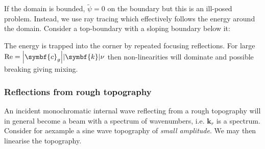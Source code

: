 \documentclass{jknotes}
\begin{document}
If the domain is bounded, $\tilde{\psi} = 0$ on the boundary but this is an
ill-posed problem. Instead, we use ray tracing which effectively follows the
energy around the domain. Consider a top-boundary with a sloping boundary
below it:
\begin{center}
\end{center}
The energy is trapped into the corner by repeated focusing reflections. For
large $\text{Re} = \abs{\symbf{c}_g}{\abs{\symbf{k}}\nu}$ then non-linearities
will dominate and possible breaking giving mixing. 

\subsubsection{Reflections from rough topography}
An incident monochromatic internal wave reflecting from a rough topography
will in general become a beam with a spectrum of wavenumbers, i.e.
$\symbf{k}_r$ is a spectrum. Consider for aexample a sine wave topography of
\emph{small amplitude}. We may then linearise the topography.
\end{document}
